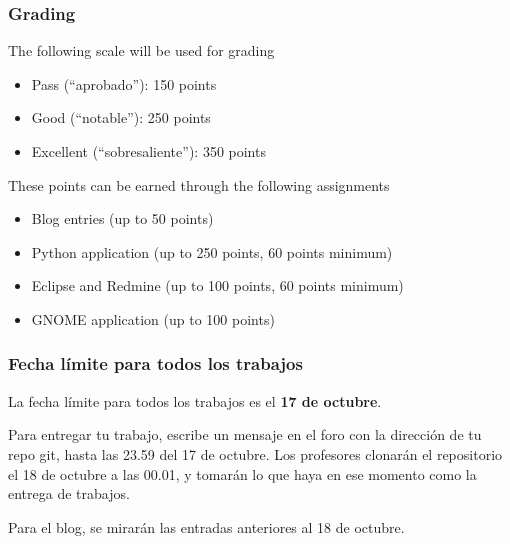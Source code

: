 \documentclass[11pt]{beamer}
\begin{document}
\begin{frame}[fragile]\frametitle{Grading}
\label{sec-1_4}

The following scale will be used for grading
\begin{itemize}
\item Pass (``aprobado''): 150 points
\item Good (``notable''): 250 points
\item Excellent (``sobresaliente''): 350 points
\end{itemize}

These points can be earned through the following assignments
\begin{itemize}
\item Blog entries (up to 50 points)
\item Python application (up to 250 points, 60 points minimum)
\item Eclipse and Redmine (up to 100 points, 60 points minimum)
\item GNOME application (up to 100 points)
\end{itemize}
\end{frame}


\begin{frame}[fragile]\frametitle{Fecha límite para todos los trabajos}
\label{sec-1_5}
\begin{alertblock}{}
  La fecha límite para todos los trabajos es el {\bf 17 de octubre}.

Para entregar tu trabajo, escribe un mensaje en el foro con la
dirección de tu repo git, hasta las 23.59 del 17 de octubre. 
Los profesores clonarán el repositorio el 18 de octubre a las 00.01, y
tomarán lo que haya en ese momento como la entrega de trabajos.

Para el blog, se mirarán las entradas anteriores al 18 de octubre.
\end{alertblock}
\end{frame}
\end{document}
